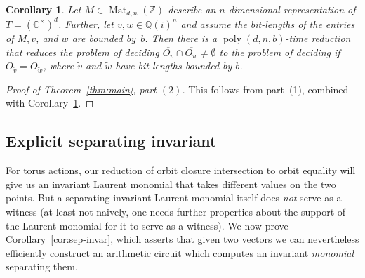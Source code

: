\documentclass[10pt,a4paper]{article}
\DeclareMathOperator{\poly}{poly}
\DeclareMathOperator{\Mat}{Mat}
\newtheorem{corollary}[theorem]{Corollary}
\theoremstyle{definition}
\numberwithin{equation}{section}
\newcommand{\QQ}{\mathbb{Q}}
\newcommand{\CC}{\mathbb{C}}
\newcommand{\ZZ}{\mathbb{Z}}
\begin{document}
\begin{corollary} \label{cor:red-oci-oe}
Let $M \in \Mat_{d,n}(\ZZ)$ describe an $n$-dimensional representation of $T = (\CC^\times)^d$.
Further, let $v,w \in \QQ(i)^n$ and assume the bit-lengths of the entries of $M,v$, and $w$ are bounded by~$b$.
Then there is a $\poly(d,n,b)$-time reduction that reduces the problem of deciding $\overline{O_v} \cap \overline{O_w} \ne \emptyset$
to the problem of deciding if $O_{\widetilde{v}} = O_{\widetilde{w}}$, where $\widetilde{v}$ and $\widetilde{w}$ have bit-lengths bounded by $b$.
\end{corollary}

\begin{proof}[Proof of Theorem~\ref{thm:main}, part $(2)$]
This follows from part~(1), combined with Corollary~\ref{cor:red-oci-oe}.
\end{proof}

%
\subsection{Explicit separating invariant}
%
For torus actions, our reduction of orbit closure intersection to orbit equality will give us an invariant Laurent monomial that takes different values on the two points.
But a separating invariant Laurent monomial itself does \emph{not} serve as a witness (at least not naively, one needs further properties about the support of the Laurent monomial for it to serve as a witness).
We now prove Corollary~\ref{cor:sep-invar}, which asserts that given two vectors we can nevertheless efficiently construct an arithmetic circuit which computes an invariant \emph{monomial} separating them.
\end{document}
